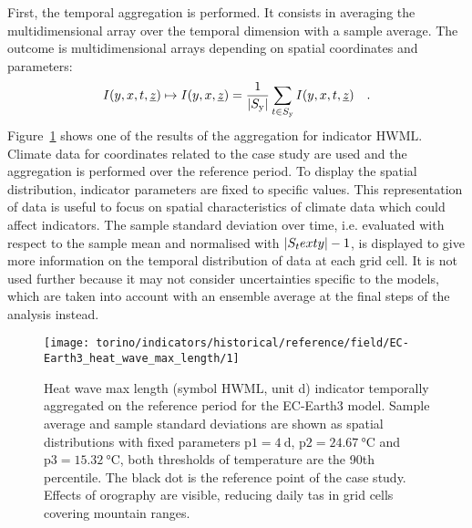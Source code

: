 First, the temporal aggregation is performed. It consists in averaging the multidimensional array over the temporal dimension with a sample average. The outcome is multidimensional arrays depending on spatial coordinates and parameters:
\begin{equation}
  \label{eq:temporal_aggregation}
  I(y, x, t, \underline{z}) \mapsto I(y, x, \underline{z}) = \frac{1}{\lvert S_\text{y}\rvert} \sum_{t \in S_\text{y}} I(y, x, t, \underline{z})
  \quad .
\end{equation}
Figure~\ref{fig:historical_reference_field_EC-Earth3_heat_wave_max_length} shows one of the results of the aggregation for \gls{indicator} $\mathrm{HWML}$. Climate data for coordinates related to the case study are used and the aggregation is performed over the reference period. To display the spatial distribution, indicator parameters are fixed to specific values. This representation of data is useful to focus on spatial characteristics of climate data which could affect indicators. The sample standard deviation over time, i.e. evaluated with respect to the sample mean and normalised with $\lvert S_ text{y}\rvert - 1$, is displayed to give more information on the temporal distribution of data at each grid cell. It is not used further because it may not consider uncertainties specific to the models, which are taken into account with an ensemble average at the final steps of the analysis instead.
\begin{figure}[h]
  \centering
  \texttt{[image: torino/indicators/historical/reference/field/EC-Earth3\_heat\_wave\_max\_length/1]}
  \caption{{Heat wave max length} (symbol $\mathrm{HWML}$, unit \unit{\day}) indicator temporally aggregated on the reference period for the EC-Earth3 model. Sample average and sample standard deviations are shown as spatial distributions with fixed parameters $\mathrm{p1} = \qty{4}{\day}$, $\mathrm{p2} = \qty{24.67}{\degreeCelsius}$ and $\mathrm{p3} = \qty{15.32}{\degreeCelsius}$, both thresholds of temperature are the 90th percentile. The black dot is the reference point of the case study. Effects of orography are visible, reducing daily \gls{tas} in grid cells covering mountain ranges.}
  \label{fig:historical_reference_field_EC-Earth3_heat_wave_max_length}
\end{figure}

